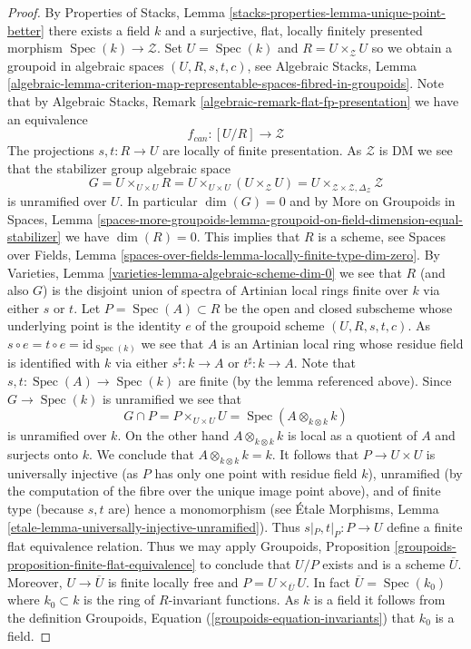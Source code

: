 \documentclass[10pt,a4paper]{amsart}
\theoremstyle{plain}
\theoremstyle{definition}
\theoremstyle{remark}
\numberwithin{equation}{subsection}
\def\Spec{\mathop{\mathrm{Spec}}}
\begin{document}
\begin{proof}
By
Properties of Stacks, Lemma \ref{stacks-properties-lemma-unique-point-better}
there exists a field $k$ and a surjective, flat, locally finitely presented
morphism $\Spec(k) \to \mathcal{Z}$. Set $U = \Spec(k)$ and
$R = U \times_\mathcal{Z} U$ so we obtain a groupoid in algebraic spaces
$(U, R, s, t, c)$, see
Algebraic Stacks, Lemma
\ref{algebraic-lemma-criterion-map-representable-spaces-fibred-in-groupoids}.
Note that by
Algebraic Stacks, Remark \ref{algebraic-remark-flat-fp-presentation}
we have an equivalence
$$
f_{can} : [U/R] \longrightarrow \mathcal{Z}
$$
The projections $s, t : R \to U$ are locally of finite presentation.
As $\mathcal{Z}$ is DM we see that the stabilizer group algebraic space
$$
G = U \times_{U \times U} R = U \times_{U \times U} (U \times_\mathcal{Z} U) =
U \times_{\mathcal{Z} \times \mathcal{Z}, \Delta_\mathcal{Z}} \mathcal{Z}
$$
is unramified over $U$. In particular $\dim(G) = 0$ and by
More on Groupoids in Spaces, Lemma
\ref{spaces-more-groupoids-lemma-groupoid-on-field-dimension-equal-stabilizer}
we have $\dim(R) = 0$. This implies that $R$ is a scheme, see
Spaces over Fields, Lemma
\ref{spaces-over-fields-lemma-locally-finite-type-dim-zero}.
By
Varieties, Lemma \ref{varieties-lemma-algebraic-scheme-dim-0}
we see that $R$ (and also $G$) is the disjoint union of spectra of
Artinian local rings finite over $k$ via either $s$ or $t$. Let
$P = \Spec(A) \subset R$ be the open and
closed subscheme whose underlying point is the identity $e$ of the groupoid
scheme $(U, R, s, t, c)$. As
$s \circ e = t \circ e = \text{id}_{\Spec(k)}$ we see that $A$
is an Artinian local ring whose residue field is identified with $k$
via either $s^\sharp : k \to A$ or $t^\sharp : k \to A$.
Note that $s, t : \Spec(A) \to \Spec(k)$
are finite (by the lemma referenced above). Since
$G \to \Spec(k)$ is unramified we see that
$$
G \cap P = P \times_{U \times U} U = \Spec(A \otimes_{k \otimes k} k)
$$
is unramified over $k$. On the other hand $A \otimes_{k \otimes k} k$
is local as a quotient of $A$ and surjects onto $k$. We conclude that
$A \otimes_{k \otimes k} k = k$. It follows that $P \to U \times U$
is universally injective (as $P$ has only one point with residue field $k$),
unramified (by the computation of the fibre over the unique image point
above), and of finite type (because $s, t$ are) hence a monomorphism (see
\'Etale Morphisms, Lemma
\ref{etale-lemma-universally-injective-unramified}).
Thus $s|_P, t|_P : P \to U$ define a finite flat equivalence
relation. Thus we may apply
Groupoids, Proposition \ref{groupoids-proposition-finite-flat-equivalence}
to conclude that $U/P$ exists and is a scheme $\overline{U}$.
Moreover, $U \to \overline{U}$ is finite locally free and
$P = U \times_{\overline{U}} U$.
In fact $\overline{U} = \Spec(k_0)$ where $k_0 \subset k$ is the
ring of $R$-invariant functions. As $k$ is a field it follows
from the definition
Groupoids, Equation (\ref{groupoids-equation-invariants})
that $k_0$ is a field.


\end{proof}
\end{document}
